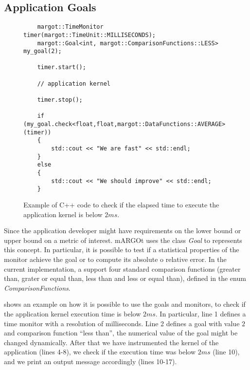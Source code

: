 \subsection{Application Goals}

\begin{figure}[!t]
	\centering
	\lstset{language=MyCPP}
	\begin{lstlisting}
	margot::TimeMonitor timer(margot::TimeUnit::MILLISECONDS);
	margot::Goal<int, margot::ComparisonFunctions::LESS> my_goal(2);
	
	timer.start();
	
	// application kernel
	
	timer.stop();
	
	if (my_goal.check<float,float,margot::DataFunctions::AVERAGE>(timer))
	{
		std::cout << "We are fast" << std::endl;
	}
	else
	{
		std::cout << "We should improve" << std::endl;
	}
	\end{lstlisting}
	\caption{Example of C++ code to check if the elapsed time to execute the application kernel is below $2ms$.}
	\label{fig:goal_examples}
\end{figure}

Since the application developer might have requirements on the lower bound or upper bound on a metric of interest.
mARGOt uses the class \textit{Goal} to represents this concept.
In particular, it is possible to test if a statistical properties of the monitor achieve the goal or to compute its absolute o relative error.
In the current implementation, a support four standard comparison functions (greater than, grater or equal than, less than and less or equal than), defined in the enum \textit{ComparisonFunctions}.

 shows an example on how it is possible to use the goals and monitors, to check if the application kernel execution time is below $2ms$.
In particular, line 1 defines a time monitor with a resolution of milliseconds.
Line 2 defines a goal with value $2$ and comparison function ``less than'', the numerical value of the goal might be changed dynamically.
After that we have instrumented the kernel of the application (lines 4-8), we check if the execution time was below $2ms$ (line 10), and we print an output message accordingly (lines 10-17). 

 
 

 
